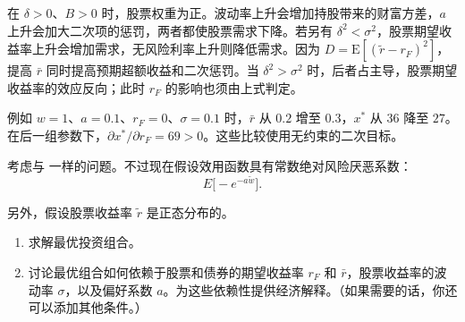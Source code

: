 \begin{solution}[blank-type=manual,blank-vsep=9\baselineskip]
\begin{enumerate}[label=(\alph*)]
在 $\delta>0$、$B>0$ 时，股票权重为正。波动率上升会增加持股带来的财富方差，$a$ 上升会加大二次项的惩罚，两者都使股票需求下降。若另有 $\delta^2<\sigma^2$，股票期望收益率上升会增加需求，无风险利率上升则降低需求。因为 $D=\mathrm E[(\tilde r-r_F)^2]$，提高 $\bar r$ 同时提高预期超额收益和二次惩罚。当 $\delta^2>\sigma^2$ 时，后者占主导，股票期望收益率的效应反向；此时 $r_F$ 的影响也须由上式判定。

例如 $w=1$、$a=0.1$、$r_F=0$、$\sigma=0.1$ 时，$\bar r$ 从 $0.2$ 增至 $0.3$，$x^*$ 从 $36$ 降至 $27$。在后一组参数下，$\partial x^*/\partial r_F=69>0$。这些比较使用无约束的二次目标。
\qedhere
\end{enumerate}
\end{solution}

\begin{samepage}
\begin{problem}
 考虑与 一样的问题。不过现在假设效用函数具有常数绝对风险厌恶系数：
\[
    E\bigl[-e^{-a\tilde{w}}\bigr].
\]

另外，假设股票收益率 $\tilde{r}$ 是正态分布的。
\begin{enumerate}[label=(\alph*)]
    \item 求解最优投资组合。
    \item 讨论最优组合如何依赖于股票和债券的期望收益率 $r_{F}$ 和 $\bar{r}$，股票收益率的波动率 $\sigma$，以及偏好系数 $a$。为这些依赖性提供经济解释。（如果需要的话，你还可以添加其他条件。）
\end{enumerate}
\end{problem}
\end{samepage}
